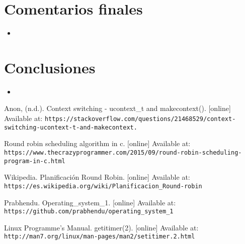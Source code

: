 \documentclass{article}
\begin{document}
\section{Comentarios finales}
\begin{itemize}
  \item 
\end{itemize}

\section{Conclusiones}
\begin{itemize}
  \item 
\end{itemize}

\begin{thebibliography}{99}
   Anon, (n.d.). Context switching - ucontext\_t and makecontext(). [online] Available at: \texttt{https://stackoverflow.com/questions/21468529/context-switching-ucontext-t-and-makecontext.}
  
   Round robin scheduling algorithm in c. [online] Available at: \texttt{https://www.thecrazyprogrammer.com/2015/09/round-robin-scheduling-program-in-c.html}

   Wikipedia. Planificación Round Robin.  [online] Available at: \texttt{https://es.wikipedia.org/wiki/Planificacion\_Round-robin} 

   Prabhendu. Operating\_system\_1.  [online] Available at: \texttt{https://github.com/prabhendu/operating\_system\_1} 

   Linux Programme's Manual. getitimer(2).  [online] Available at: \texttt{http://man7.org/linux/man-pages/man2/setitimer.2.html} 
 
 
 
\end{thebibliography}
\end{document}
